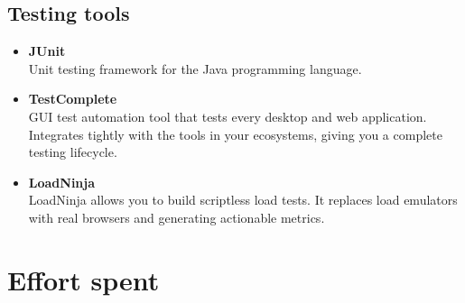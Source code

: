 \documentclass[10pt]{article} %
\begin{document}
\subsection{Testing tools}
\begin{itemize}
    \item \textbf{JUnit}\\Unit testing framework for the Java programming language.
    \item \textbf{TestComplete}\\GUI test automation tool that tests every desktop and web application. Integrates tightly with 
    the tools in your ecosystems, giving you a complete testing lifecycle.
    \item \textbf{LoadNinja}\\LoadNinja allows you to build scriptless load tests. It replaces load emulators with real browsers and generating actionable metrics.
\end{itemize}


\section{Effort spent}


\end{document}
